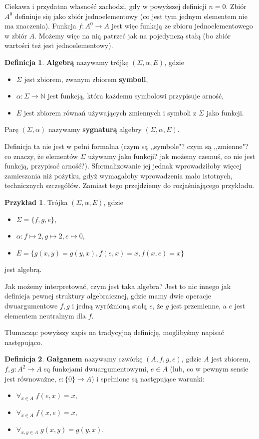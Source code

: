 \documentclass{book}
\theoremstyle{definition}
\newtheorem{definition}{Definicja}[section]
\newtheorem{example}{Przykład}[section]
\begin{document}
Ciekawa i przydatna własność zachodzi, gdy w powyższej definicji $n = 0$.
Zbiór $A^0$ definiuje się jako zbiór jednoelementowy (co jest tym jednym elementem nie ma znaczenia).
Funkcja $f:A^0 \to A$ jest więc funkcją ze zbioru jednoelementowego w zbiór $A$.
Możemy więc na nią patrzeć jak na pojedynczą stałą (bo zbiór wartości też jest jednoelementowy).

\begin{definition}
	\textbf{Algebrą} nazywamy trójkę $(\Sigma, \alpha, E)$,
	gdzie
	\begin{itemize}
		\item $\Sigma$ jest zbiorem, zwanym zbiorem \textbf{symboli},
		\item $\alpha: \Sigma \to \mathbb{N}$ jest funkcją, która każdemu symbolowi przypisuje arność,
		\item $E$ jest zbiorem równań używających zmiennych i symboli z $\Sigma$ jako funkcji.
	\end{itemize}
	Parę $(\Sigma, \alpha)$ nazywamy \textbf{sygnaturą} algebry $(\Sigma, \alpha, E)$.
\end{definition}

Definicja ta nie jest w pełni formalna (czym są ,,symbole"? czym są ,,zmienne"?
	co znaczy, że elementów $\Sigma$ używamy jako funkcji?
	jak możemy czemuś, co nie jest funkcją, przypisać arność?).
Sformalizowanie jej jednak wprowadziłoby więcej zamieszania niż pożytku,
	gdyż wymagałoby wprowadzenia mało istotnych, technicznych szczegółów.
Zamiast tego przejdziemy do rozjaśniającego przykładu.

\begin{example}
	Trójka $(\Sigma, \alpha, E)$, gdzie
	\begin{itemize}
		\item $\Sigma = \{f, g, e\}$,
		\item $\alpha: f \mapsto 2, g \mapsto 2, e \mapsto 0$,
		\item $E = \{g(x, y) = g(y, x), f(e, x) = x, f(x, e) = x\}$
	\end{itemize}
	jest algebrą.
\end{example}
Jak możemy interpretować, czym jest taka algebra?
Jest to nic innego jak definicja pewnej struktury algebraicznej,
gdzie mamy dwie operacje dwuargumentowe $f, g$ i jedną wyróżnioną stałą $e$,
że $g$ jest przemienne, a $e$ jest elementem neutralnym dla $f$.

Tłumacząc powyższy zapis na tradycyjną definicję, moglibyśmy napisać następująco.
\begin{definition}
	\textbf{Gałganem} nazywamy czwórkę $(A, f, g, e)$,
		gdzie $A$ jest zbiorem,
		$f, g: A^2 \to A$ są funkcjami dwuargumentowymi,
		$e \in A$ (lub, co w pewnym sensie jest równoważne, $e: \{0\} \to A$)
		i spełnione są następujące warunki:
	\begin{itemize}
		\item $\forall_{x\in A}\; f(e, x) = x,$
		\item $\forall_{x\in A}\; f(x, e) = x,$
		\item $\forall_{x,y\in A}\; g(x, y) = g(y, x).$
	\end{itemize}
\end{definition}
\end{document}
